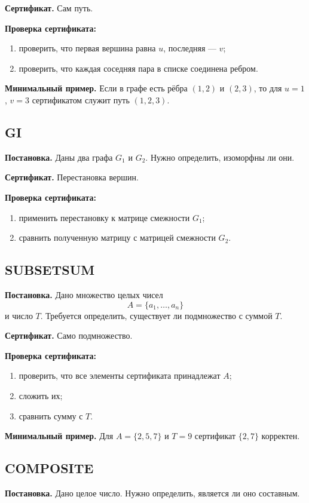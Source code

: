 \documentclass[12pt,a4paper]{article}
\theoremstyle{definition}
\theoremstyle{plain}
\begin{document}
\textbf{Сертификат.} Сам путь.

\textbf{Проверка сертификата:}
\begin{enumerate}
\item проверить, что первая вершина равна $u$, последняя --- $v$;
\item проверить, что каждая соседняя пара в списке соединена ребром.
\end{enumerate}

\textbf{Минимальный пример.}
Если в графе есть рёбра $(1,2)$ и $(2,3)$, то для $u=1$, $v=3$ сертификатом служит путь $(1,2,3)$.

\subsection{\textsc{GI}}
\textbf{Постановка.} Даны два графа $G_1$ и $G_2$. Нужно определить, изоморфны ли они.

\textbf{Сертификат.} Перестановка вершин.

\textbf{Проверка сертификата:}
\begin{enumerate}
\item применить перестановку к матрице смежности $G_1$;
\item сравнить полученную матрицу с матрицей смежности $G_2$.
\end{enumerate}

\subsection{\textsc{SUBSETSUM}}
\textbf{Постановка.} Дано множество целых чисел
\[
A=\{a_1,\dots,a_n\}
\]
и число $T$. Требуется определить, существует ли подмножество с суммой $T$.

\textbf{Сертификат.} Само подмножество.

\textbf{Проверка сертификата:}
\begin{enumerate}
\item проверить, что все элементы сертификата принадлежат $A$;
\item сложить их;
\item сравнить сумму с $T$.
\end{enumerate}

\textbf{Минимальный пример.}
Для $A=\{2,5,7\}$ и $T=9$ сертификат $\{2,7\}$ корректен.

\subsection{\textsc{COMPOSITE}}
\textbf{Постановка.} Дано целое число. Нужно определить, является ли оно составным.
\end{document}
